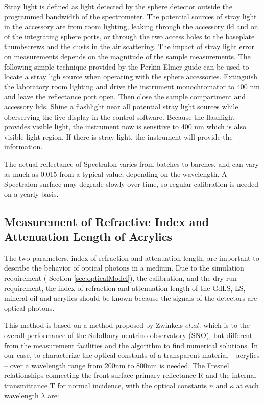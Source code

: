 Stray light is defined as light detected by the sphere detector outside the programmed bandwidth of the spectrometer.
The potential sources of stray light in the accessory are from
room lighting, leaking through the accessory ild and on of the integrating sphere ports, or
through the two access holes to the baseplate thumbscrews and the dusts in the air scattering.
The impact of stray light error on measurements depends on the magnitude of the sample measurements.
The following simple technique provided by the Perkin Elmer guide can be used to locate a stray ligh source when operating with
the sphere accessories. Extinguish the laboratory room lighting and drive the instrument monochromator to 400 nm and leave the reflectance port open.
Then close the sample compartment and accessory lids. Shine a flashlight near all potential stray light sources while oberserving the live display in the
control software. Because the flashlight provides visible light, the instrument now is sensitive to 400 nm which is also visible light region. If there is stray light, the instrument will provide the information.

The actual reflectance of Spectralon varies from batches to barches, and can vary as much as 0.015 from a typical value, depending on the wavelength.
A Spectralon surface may degrade slowly over time, so regular calibration is needed on a yearly basis.


\subsection {Measurement of Refractive Index and Attenuation Length of Acrylics}
\label {sec:RTMethod}

The two parameters, index of refraction and attenuation length, are important
to describe the behavior of optical photons in a medium.
Due to the simulation requirement ( Section \ref{sec:opticalModel}), the calibration, and the dry run requirement,
the index of refraction and attenuation length
of the GdLS, LS, mineral oil and acrylics should be known because the signals of the detectors
are optical photons.




This method is based on a method proposed by Zwinkels $et. al.$ \cite{RTMethod} which
is to the overall performance of the Subdbury neutrino observatory (SNO),
but different from the measurement facilities and the algorithm to find numerical solutions.
In our case, to characterize the optical constants of a
transparent material -- acrylics -- over a wavelength range from 200nm to 800nm is needed.
The Fresnel relationships connecting the front-surface
primary reflectance R and the internal transmittance T for normal incidence, with the optical constants $n$ and $\kappa$ at each wavelength $\lambda$
are:


